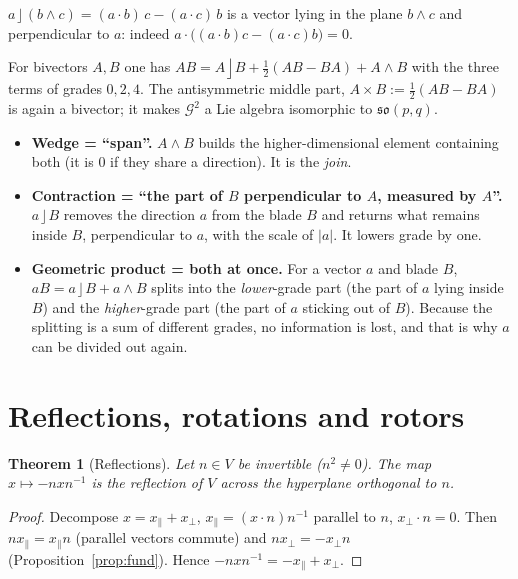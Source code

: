 \documentclass[11pt,a4paper]{article}
\newcounter{thm}[section]
\numberwithin{equation}{section}
\theoremstyle{definition}
\theoremstyle{plain}
\newtheorem{theorem}[thm]{Theorem}
\newcommand{\GA}{\mathcal{G}}
\newcommand{\lc}{\mathbin{\rfloor}}
\begin{document}
\begin{example}
$a\lc(b\wedge c)=(a\cdot b)\,c-(a\cdot c)\,b$ is a vector lying in the plane $b\wedge c$ and perpendicular to $a$: indeed $a\cdot\bigl((a\cdot b)c-(a\cdot c)b\bigr)=0$.
\end{example}

\begin{remark}
For bivectors $A,B$ one has $AB=A\lc B+\tfrac12(AB-BA)+A\wedge B$ with the three terms of grades $0,2,4$. The antisymmetric middle part, $A\times B:=\tfrac12(AB-BA)$ is again a bivector; it makes $\GA^2$ a Lie algebra isomorphic to $\mathfrak{so}(p,q)$.
\end{remark}

\begin{intuition}
\begin{itemize}
  \item \textbf{Wedge = ``span''.} $A\wedge B$ builds the higher-dimensional element containing both (it is $0$ if they share a direction). It is the \emph{join}.
  \item \textbf{Contraction = ``the part of $B$ perpendicular to $A$, measured by $A$''.} $a\lc B$ removes the direction $a$ from the blade $B$ and returns what remains inside $B$, perpendicular to $a$, with the scale of $|a|$. It lowers grade by one.
  \item \textbf{Geometric product = both at once.} For a vector $a$ and blade $B$, $aB=a\lc B+a\wedge B$ splits into the \emph{lower}-grade part (the part of $a$ lying inside $B$) and the \emph{higher}-grade part (the part of $a$ sticking out of $B$). Because the splitting is a sum of different grades, no information is lost, and that is why $a$ can be divided out again.
\end{itemize}
\end{intuition}



\section{Reflections, rotations and rotors}\label{sec:rotors}

\begin{theorem}[Reflections]\label{thm:refl}
Let $n\in V$ be invertible ($n^2\neq0$). The map $x\mapsto -nxn^{-1}$ is the reflection of $V$ across the hyperplane orthogonal to $n$.
\end{theorem}
\begin{proof}
Decompose $x=x_\parallel+x_\perp$, $x_\parallel=(x\cdot n)n^{-1}$ parallel to $n$, $x_\perp\cdot n=0$. Then $nx_\parallel=x_\parallel n$ (parallel vectors commute) and $nx_\perp=-x_\perp n$ (Proposition~\ref{prop:fund}). Hence
$-nxn^{-1}=-x_\parallel+x_\perp$.
\end{proof}
\end{document}

